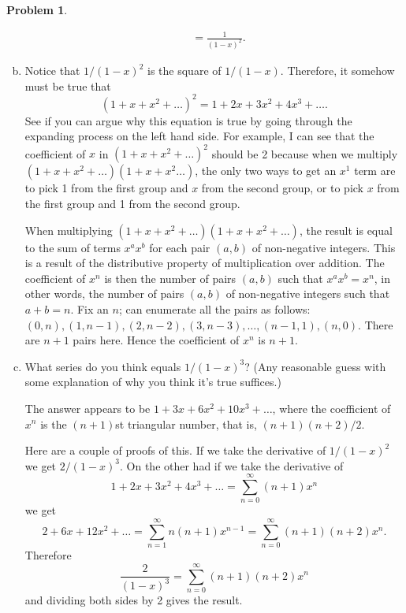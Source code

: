 \documentclass[11pt,oneside]{amsart}
\theoremstyle{definition}
\newtheorem{problem}{Problem}
\theoremstyle{plain}
\begin{document}
\begin{problem}
\begin{enumerate}[(a)]
\begin{solution}
\[\begin{split}
                    &= \frac 1{(1-x)^2}.
                \end{split}\]
            \end{solution}
            \item Notice that $1/(1-x)^2$ is the square of $1/(1-x)$. Therefore, it somehow must be true that
            \[(1+x+x^2+\dots)^2=1+2x+3x^2+4x^3+\dots.\]
            See if you can argue why this equation is true by going through the expanding process on the left hand side. For example, I can see that the coefficient of $x$ in $(1+x+x^2+\dots)^2$ should be 2 because when we multiply $(1+x+x^2+\dots)(1+x+x^2\dots)$, the only two ways to get an $x^1$ term are to pick 1 from the first group and $x$ from the second group, or to pick $x$ from the first group and 1 from the second group.
            \begin{solution}
                When multiplying $(1+x+x^2+\dots)(1+x+x^2+\dots)$, the result is equal to the sum of terms $x^ax^b$ for each pair $(a,b)$ of non-negative integers. This is a result of the distributive property of multiplication over addition. The coefficient of $x^n$ is then the number of pairs $(a,b)$ such that $x^ax^b=x^n$, in other words, the number of pairs $(a,b)$ of non-negative integers such that $a+b=n$. Fix an $n$; can enumerate all the pairs as follows: $(0,n),(1,n-1),(2,n-2),(3,n-3),\dots,(n-1,1),(n,0)$. There are $n+1$ pairs here. Hence the coefficient of $x^n$ is $n+1$.
            \end{solution}
            \item What series do you think equals $1/(1-x)^3$? (Any reasonable guess with some explanation of why you think it's true suffices.)
            \begin{solution}
                The answer appears to be $1+3x+6x^2+10x^3+\dots$, where the coefficient of $x^n$ is the $(n+1)$st triangular number, that is, $(n+1)(n+2)/2$.

                Here are a couple of proofs of this. If we take the derivative of $1/(1-x)^2$ we get $2/(1-x)^3$. On the other had if we take the derivative of
                \[1+2x+3x^2+4x^3+\dots=\sum_{n=0}^\infty (n+1)x^n\]
                we get
                \[2+6x+12x^2+\dots=\sum_{n=1}^\infty n(n+1)x^{n-1}=\sum_{n=0}^\infty (n+1)(n+2)x^n.\]
                Therefore
                \[\frac 2{(1-x)^3}=\sum_{n=0}^\infty (n+1)(n+2)x^n\]
                and dividing both sides by 2 gives the result.


\end{solution}
\end{enumerate}
\end{problem}
\end{document}
